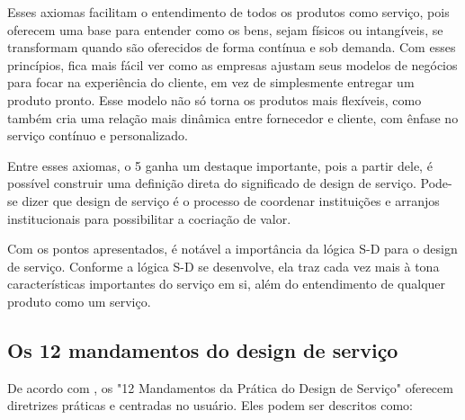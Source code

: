 Esses axiomas facilitam o entendimento de todos os produtos como serviço, pois oferecem uma base para entender como os bens, sejam físicos ou intangíveis, se transformam quando são oferecidos de forma contínua e sob demanda. Com esses princípios, fica mais fácil ver como as empresas ajustam seus modelos de negócios para focar na experiência do cliente, em vez de simplesmente entregar um produto pronto. Esse modelo não só torna os produtos mais flexíveis, como também cria uma relação mais dinâmica entre fornecedor e cliente, com ênfase no serviço contínuo e personalizado.

Entre esses axiomas, o 5 ganha um destaque importante, pois a partir dele, é possível construir uma definição direta do significado de design de serviço. Pode-se dizer que design de serviço é o processo de coordenar instituições e arranjos institucionais para possibilitar a cocriação de valor.

Com os pontos apresentados, é notável a importância da lógica S-D para o design de serviço. Conforme a lógica S-D se desenvolve, ela traz cada vez mais à tona características importantes do serviço em si, além do entendimento de qualquer produto como um serviço.

\subsection{Os 12 mandamentos do design de serviço}

De acordo com \cite{Stickdorn2019}, os "12 Mandamentos da Prática do Design de Serviço" oferecem diretrizes práticas e centradas no usuário. Eles podem ser descritos como:

